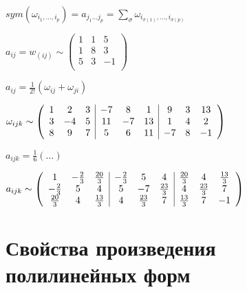 \documentclass{book}
\theoremstyle{definition}
\begin{document}
$sym(\omega_{i_1 , \ldots, i_p}) = a_{j_1 \ldots j_p} = \sum_{\sigma}\omega_{i_{\sigma(1)}, \ldots, i_{\sigma(p)}}$

$a_{ij} = w_{(ij)} \sim \begin{pmatrix} 1 & 1 & 5\\ 1& 8 & 3\\5 &3 & -1\\ \end{pmatrix} $ 

$a_{ij} = \frac{1}{2!}(\omega_{ij} + \omega_{ji})$

$\omega_{ijk} \sim \left( 
    \begin{array}{c c c | c c c| c c c}
        1 & 2 & 3 & -7 & 8 & 1 & 9 & 3 & 13\\
        3 & -4 & 5 & 11 & -7 & 13 & 1 & 4 & 2\\
        8 & 9 & 7 & 5 & 6 & 11 & -7 & 8 & -1\\
\end{array}
\right) $


$a_{ijk} = \frac{1}{6}\left( \ldots \right) $ 

$a_{ijk} \sim \left( 
    \begin{array} {c c c| c c c| c c c}
        1 & -\frac{2}{3} & \frac{20}{3} & -\frac{2}{3} & 5 & 4 & \frac{20}{3} &4 & \frac{13}{3}\\
        -\frac{2}{3} & 5 & 4 & 5 & -7 & \frac{23}{3} & 4& \frac{23}{3} & 7 \\
        \frac{20}{3} &4 & \frac{13}{3} &4 &\frac{23}{3} &7& \frac{13}{3} &7 & -1\\
    
\end{array}
\right) $

\section{Свойства произведения полилинейных форм}
\end{document}
